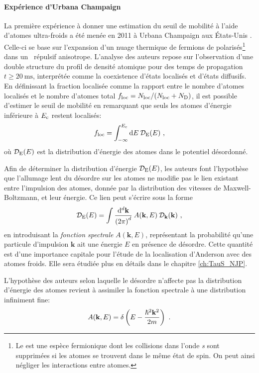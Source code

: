\paragraph*{Expérience d'Urbana Champaign}
La première expérience à donner une estimation du seuil de mobilité à l'aide d'atomes ultra-froids a été menée en 2011 à Urbana Champaign aux États-Unis \citep{kondov2011three}. Celle-ci se base sur l'expansion d'un nuage thermique de fermions de  polarisés\footnote{Le  est une espèce fermionique dont les collisions dans l'onde \textit{s} sont supprimées si les atomes se trouvent dans le même état de spin. On peut ainsi négliger les interactions entre atomes.} dans un \speckle\ répulsif anisotrope. L'analyse des auteurs repose sur l'observation d'une double structure du profil de densité atomique pour des temps de propagation $t\geq \SI{20}{\milli\second}$, interprétée comme la coexistence d'états localisés et d'états diffusifs. En définissant la fraction localisée comme la rapport entre le nombre d'atomes localisés et le nombre d'atomes total $f_{\mathrm{loc}}=N_{\mathrm{loc}}/(N_{\mathrm{loc}}+N_{\mathrm{D}})$, il est possible d'estimer le seuil de mobilité en remarquant que seuls les atomes d'énergie inférieure à $E_{\mathrm{c}}$ restent localisés:
\begin{equation}
f_{\mathrm{loc}}=\int_{-\infty}^{E_{\mathrm{c}}}{\mathop{}\mathopen{}\mathrm{d} E \: \mathcal{D}_{\mathrm{E}}(E)} \text{ ,}
\label{eq:fraction_localisee}
\end{equation}
où $\mathcal{D}_{\mathrm{E}}(E)$ est la distribution d'énergie des atomes dans le potentiel désordonné.

Afin de déterminer la distribution d'énergie $\mathcal{D}_{\mathrm{E}}(E)$, les auteurs font l'hypothèse que l'allumage lent du désordre sur les atomes ne modifie pas le lien existant entre l'impulsion des atomes, donnée par la distribution des vitesses de Maxwell-Boltzmann, et leur énergie. Ce lien peut s'écrire sous la forme
\begin{equation}
\mathcal{D}_{\mathrm{E}}(E)= \int{\frac{\mathrm{d}^d \mathbf{k}}{{(2 \pi)}^d} \: A(\mathbf{k},E) \: \mathcal{D}_{\mathbf{k}}(\mathbf{k})} \text{ ,}
\label{eq:fonction_spectrale}
\end{equation}
en introduisant la \emph{fonction spectrale} $A(\mathbf{k},E)$, représentant la probabilité qu'une particule d'impulsion $\mathbf{k}$ ait une énergie $E$ en présence de désordre. Cette quantité est d'une importance capitale pour l'étude de la localisation d'Anderson avec des atomes froids. Elle sera étudiée plus en détails dans le chapitre \ref{ch:TauS_NJP}.

L'hypothèse des auteurs selon laquelle le désordre n'affecte pas la distribution d'énergie des atomes revient à assimiler la fonction spectrale à une distribution infiniment fine:
\begin{equation}
A(\mathbf{k},E) = \delta\left(E- \frac{\hslash^2 \mathbf{k}^2}{2m}\right) \text{ .}
\label{eq:hypothese_urbana_champaign}
\end{equation}

